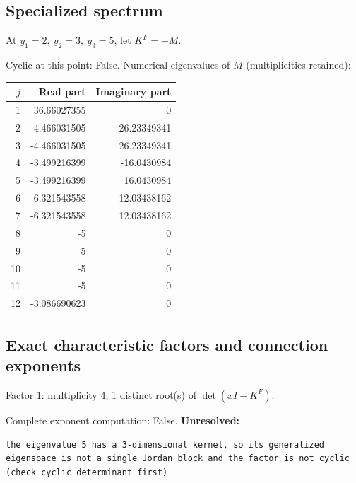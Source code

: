 \documentclass[10pt,a4paper]{article}
\newcommand{\fitmath}[1]{\sbox{\mathbox}{$\displaystyle #1$}\ifdim\wd\mathbox>\linewidth\resizebox{\linewidth}{!}{\usebox{\mathbox}}\else\usebox{\mathbox}\fi}
\begin{document}
\subsection*{Specialized spectrum}
At $y_1=2,\ y_2=3,\ y_3=5$, let $K^F=-M$.
\begin{center}\fitmath{\Delta=0}\end{center}
Cyclic at this point: False.
Numerical eigenvalues of $M$ (multiplicities retained):
\begin{center}\small\begin{tabular}{rrr}\toprule $j$ & Real part & Imaginary part\\\midrule
1 & 36.66027355 & 0\\
2 & -4.466031505 & -26.23349341\\
3 & -4.466031505 & 26.23349341\\
4 & -3.499216399 & -16.0430984\\
5 & -3.499216399 & 16.0430984\\
6 & -6.321543558 & -12.03438162\\
7 & -6.321543558 & 12.03438162\\
8 & -5 & 0\\
9 & -5 & 0\\
10 & -5 & 0\\
11 & -5 & 0\\
12 & -3.086690623 & 0\\
\bottomrule\end{tabular}\end{center}
\subsection*{Exact characteristic factors and connection exponents}
Factor 1: multiplicity 4; 1 distinct root(s) of $\det(xI-K^F)$.
\begin{center}\fitmath{\begin{aligned}p_{1}(x)&=x - 5\end{aligned}}\end{center}
Complete exponent computation: False.
\textbf{Unresolved:}

\begin{lstlisting}
the eigenvalue 5 has a 3-dimensional kernel, so its generalized eigenspace is not a single Jordan block and the factor is not cyclic (check cyclic_determinant first)
\end{lstlisting}
\end{document}
